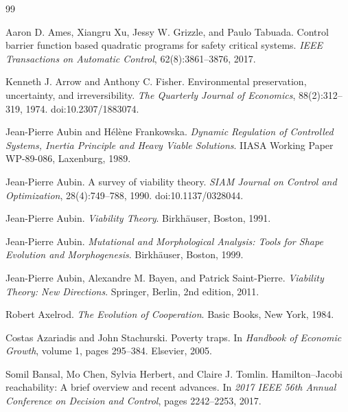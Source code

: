 \documentclass[11pt,a4paper]{article}
\theoremstyle{remark}
\begin{document}
\begin{thebibliography}{99}

Aaron D. Ames, Xiangru Xu, Jessy W. Grizzle, and Paulo Tabuada.
\newblock Control barrier function based quadratic programs for safety critical systems.
\newblock \emph{IEEE Transactions on Automatic Control}, 62(8):3861--3876, 2017.

Kenneth J. Arrow and Anthony C. Fisher.
\newblock Environmental preservation, uncertainty, and irreversibility.
\newblock \emph{The Quarterly Journal of Economics}, 88(2):312--319, 1974.
\newblock doi:10.2307/1883074.

Jean-Pierre Aubin and H\'el\`ene Frankowska.
\newblock \emph{Dynamic Regulation of Controlled Systems, Inertia Principle and Heavy Viable Solutions}.
\newblock IIASA Working Paper WP-89-086, Laxenburg, 1989.

Jean-Pierre Aubin.
\newblock A survey of viability theory.
\newblock \emph{SIAM Journal on Control and Optimization}, 28(4):749--788, 1990.
\newblock doi:10.1137/0328044.

Jean-Pierre Aubin.
\newblock \emph{Viability Theory}.
\newblock Birkh\"auser, Boston, 1991.

Jean-Pierre Aubin.
\newblock \emph{Mutational and Morphological Analysis: Tools for Shape Evolution and Morphogenesis}.
\newblock Birkh\"auser, Boston, 1999.

Jean-Pierre Aubin, Alexandre M. Bayen, and Patrick Saint-Pierre.
\newblock \emph{Viability Theory: New Directions}.
\newblock Springer, Berlin, 2nd edition, 2011.

Robert Axelrod.
\newblock \emph{The Evolution of Cooperation}.
\newblock Basic Books, New York, 1984.

Costas Azariadis and John Stachurski.
\newblock Poverty traps.
\newblock In \emph{Handbook of Economic Growth}, volume 1, pages 295--384. Elsevier, 2005.

Somil Bansal, Mo Chen, Sylvia Herbert, and Claire J. Tomlin.
\newblock Hamilton--Jacobi reachability: A brief overview and recent advances.
\newblock In \emph{2017 IEEE 56th Annual Conference on Decision and Control}, pages 2242--2253, 2017.


\end{thebibliography}
\end{document}
